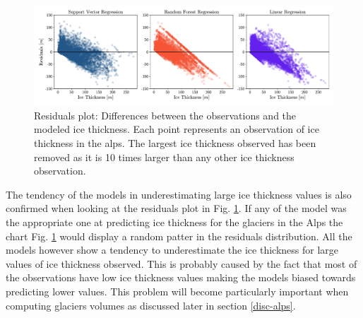 \begin{figure}[!tp]
	\centering		  
	\includegraphics[width=1.\textwidth]{figures/residuals_plot.pdf}
	\caption{Residuals plot: Differences between the observations and the modeled ice thickness. Each point represents an observation of ice thickness in the alps. The largest ice thickness observed has been removed as it is 10 times larger than any other ice thickness observation.}
	\label{fig:residuals}
\end{figure}

The tendency of the models in underestimating large ice thickness values is also confirmed when looking at the residuals plot in Fig. \ref{fig:residuals}. If any of the model was the appropriate one at predicting ice thickness for the glaciers in the Alps the chart Fig. \ref{fig:residuals} would display a random patter in the residuals distribution. All the models however show a tendency to underestimate the ice thickness for large values of ice thickness observed. This is probably caused by the fact that most of the observations have low ice thickness values making the models biased towards predicting lower values. This problem will become particularly important when computing glaciers volumes as discussed later in section \ref{disc-alps}.

